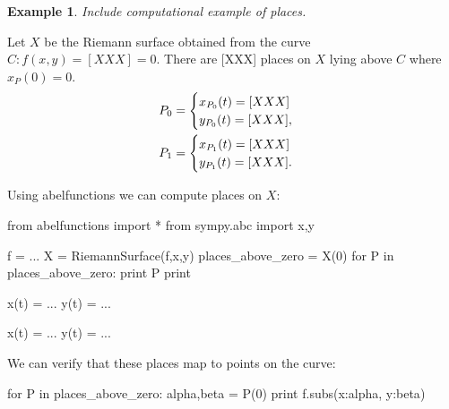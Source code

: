 \documentclass[12pt]{article}
\theoremstyle{definition}
\newtheorem{example}[theorem]{Example}
\begin{document}
\begin{example}
  {\it Include computational example of places.}

  Let $X$ be the Riemann surface obtained from the curve $C: f(x,y) =
  [XXX] = 0$. There are [XXX] places on $X$ lying above $C$ where
  $x_P(0) = 0$.
  \begin{align}
    P_0 =
    \begin{cases}
      x_{P_0}(t) = [XXX] \\
      y_{P_0}(t) = [XXX],
    \end{cases} \notag \\
    P_1 =
    \begin{cases}
      x_{P_1}(t) = [XXX] \\
      y_{P_1}(t) = [XXX].
    \end{cases}
  \end{align}

  Using {\sc abelfunctions} we can compute places on $X$:

\begin{ipythoninput}
from abelfunctions import *
from sympy.abc import x,y

f = ...
X = RiemannSurface(f,x,y)
places_above_zero = X(0)
for P in places_above_zero:
    print P
    print
\end{ipythoninput}
\begin{ipythonoutput}
x(t) = ...
y(t) = ...

x(t) = ...
y(t) = ...
\end{ipythonoutput}

  We can verify that these places map to points on the curve:

\begin{ipythoninput}
for P in places_above_zero:
    alpha,beta = P(0)
    print f.subs({x:alpha, y:beta})
\end{ipythoninput}
\begin{ipythonoutput}
[XXX]
[XXX]
\end{ipythonoutput}

\end{example}
\end{document}
